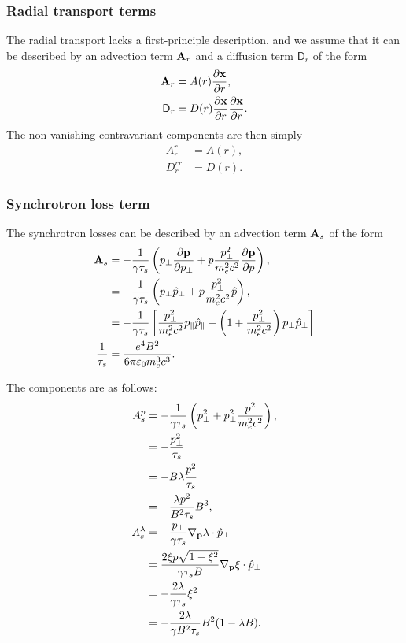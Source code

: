 \documentclass[11pt,a4paper]{article}
\renewcommand{\b}[1]{\ensuremath{ {\bf #1 } }}
\begin{document}
\subsubsection*{Radial transport terms}
The radial transport lacks a first-principle description, and we assume that it can be described by an advection term $\b{A}_r$ and a diffusion term $\mathsf{D}_r$ of the form
\begin{align}
\b{A}_r &= A(r) \frac{\partial \b{x}}{\partial r} , \nonumber \\
\mathsf{D}_r &= D(r)\frac{\partial \b{x}}{\partial r}\frac{\partial \b{x}}{\partial r}.
\end{align}
The non-vanishing contravariant components are then simply
\begin{align}
A_r^r &= A(r), \nonumber \\
D_r^{rr} &= D(r).
\end{align}

\subsubsection*{Synchrotron loss term}
The synchrotron losses can be described by an advection term $\b{A}_s$ of the form
\begin{align}
\b{A}_s &= -\frac{1}{\gamma \tau_s}\left(p_\perp\frac{\partial \b{p}}{\partial p_\perp} + p\frac{p_\perp^2}{m_e^2c^2}\frac{\partial \b{p}}{\partial p}\right), \nonumber \\
&= -\frac{1}{\gamma \tau_s}\left( p_\perp \hat{p}_\perp + p\frac{p_\perp^2}{m_e^2c^2}\hat{p}\right), \nonumber \\
&= -\frac{1}{\gamma\tau_s}\left[ \frac{p_\perp^2}{m_e^2c^2}p_\parallel \hat{p}_\parallel + \left(1+\frac{p_\perp^2}{m_e^2c^2}\right)p_\perp\hat{p}_\perp\right] \nonumber \\
\frac{1}{\tau_s} &= \frac{e^4 B^2}{6\pi\varepsilon_0 m_e^3c^3}.
\end{align}

The components are as follows:
\begin{align}
A_s^p &=    -\frac{1 }{\gamma\tau_s} \left(  p_\perp^2  + p_\perp^2 \frac{p^2}{m_e^2c^2} \right), \nonumber \\
&= -\frac{ p_\perp^2}{\tau_s}\nonumber \\
&=- B\lambda \frac{p^2}{\tau_s}\nonumber \\
&= -\frac{\lambda p^2}{B^2\tau_s}B^3, \nonumber \\
A_s^\lambda &= -\frac{p_\perp}{\gamma\tau_s} \nabla_\b{p}\lambda\cdot\hat{p}_\perp\nonumber \\
&= \frac{2\xi p\sqrt{1-\xi^2}}{\gamma\tau_s B} \nabla_\b{p} \xi \cdot \hat{p}_\perp \nonumber \\
&= -\frac{2\lambda}{\gamma\tau_s}\xi^2 \nonumber \\
&= -\frac{2\lambda}{\gamma B^2\tau_s} B^2(1-\lambda B). 
\end{align}
\end{document}
